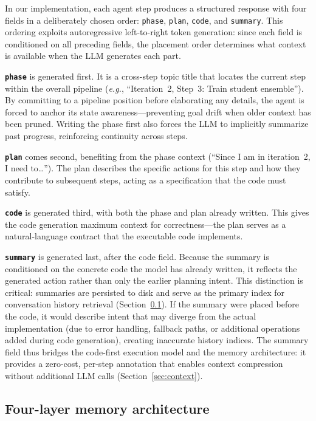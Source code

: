 \documentclass{article}
\begin{document}
In our implementation, each agent step produces a structured response with four fields in a deliberately chosen order: \texttt{phase}, \texttt{plan}, \texttt{code}, and \texttt{summary}.
This ordering exploits autoregressive left-to-right token generation: since each field is conditioned on all preceding fields, the placement order determines what context is available when the LLM generates each part.

\textbf{\texttt{phase}} is generated first.
It is a cross-step topic title that locates the current step within the overall pipeline (\emph{e.g.}, ``Iteration~2, Step~3: Train student ensemble'').
By committing to a pipeline position before elaborating any details, the agent is forced to anchor its state awareness---preventing goal drift when older context has been pruned.
Writing the phase first also forces the LLM to implicitly summarize past progress, reinforcing continuity across steps.

\textbf{\texttt{plan}} comes second, benefiting from the phase context (``Since I am in iteration~2, I need to\ldots'').
The plan describes the specific actions for this step and how they contribute to subsequent steps, acting as a specification that the code must satisfy.

\textbf{\texttt{code}} is generated third, with both the phase and plan already written.
This gives the code generation maximum context for correctness---the plan serves as a natural-language contract that the executable code implements.

\textbf{\texttt{summary}} is generated last, after the code field.
Because the summary is conditioned on the concrete code the model has already written, it reflects the generated action rather than only the earlier planning intent.
This distinction is critical: summaries are persisted to disk and serve as the primary index for conversation history retrieval (Section~\ref{sec:memory}).
If the summary were placed before the code, it would describe intent that may diverge from the actual implementation (due to error handling, fallback paths, or additional operations added during code generation), creating inaccurate history indices.
The summary field thus bridges the code-first execution model and the memory architecture: it provides a zero-cost, per-step annotation that enables context compression without additional LLM calls (Section~\ref{sec:context}).


\subsection{Four-layer memory architecture}
\label{sec:memory}
\end{document}
